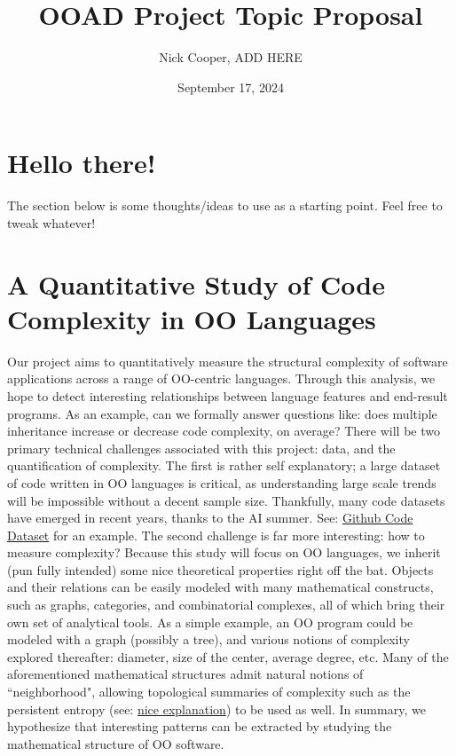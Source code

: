 \documentclass{article}
\title{OOAD Project Topic Proposal}
\author{Nick Cooper, ADD HERE}
\date{September 17, 2024}
\begin{document}
\maketitle

\section{Hello there!}
The section below is some thoughts/ideas to use as a starting point. Feel free to tweak whatever!

\section{A Quantitative Study of Code Complexity in OO Languages}
Our project aims to quantitatively measure the structural complexity of software applications across a range of OO-centric languages. Through this analysis, we hope to detect interesting relationships between language features and end-result programs. As an example, can we formally answer questions like: does multiple inheritance increase or decrease code complexity, on average? There will be two primary technical challenges associated with this project: data, and the quantification of complexity. The first is rather self explanatory; a large dataset of code written in OO languages is critical, as understanding large scale trends will be impossible without a decent sample size. Thankfully, many code datasets have emerged in recent years, thanks to the AI summer. See: \href{https://huggingface.co/datasets/codeparrot/github-code}{Github Code Dataset} for an example. The second challenge is far more interesting: how to measure complexity? Because this study will focus on OO languages, we inherit (pun fully intended) some nice theoretical properties right off the bat. Objects and their relations can be easily modeled with many mathematical constructs, such as graphs, categories, and combinatorial complexes, all of which bring their own set of analytical tools. As a simple example, an OO program could be modeled with a graph (possibly a tree), and various notions of complexity explored thereafter: diameter, size of the center, average degree, etc. Many of the aforementioned mathematical structures admit natural notions of ``neighborhood", allowing topological summaries of complexity such as the persistent entropy (see: \href{https://github.com/GUDHI/TDA-tutorial/blob/master/Tuto-GUDHI-persistent-entropy.ipynb}{nice explanation}) to be used as well. In summary, we hypothesize that interesting patterns can be extracted by studying the mathematical structure of OO software.
\end{document}
